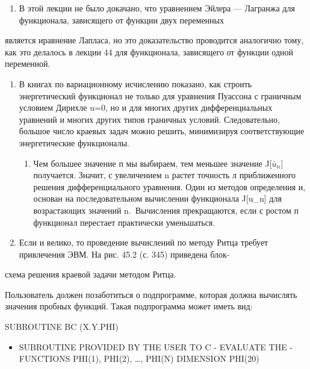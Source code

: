 \documentclass[
  ukrainian,
]{article}
\providecommand{\tightlist}{%
  \setlength{\itemsep}{0pt}\setlength{\parskip}{0pt}}
\begin{document}
\begin{enumerate}
\def\labelenumi{\arabic{enumi}.}
\setcounter{enumi}{1}
\tightlist
\item
  В этой лекции не было докачано, что уравнением Эйлера --- Лагранжа для
  функционала, зависящего от функции двух переменных
\end{enumerate}

является иравнение Лапласа, но это доказательство проводится аналогично
тому, как это делалось в лекции 44 для функционала, зависящего от
функции одной переменной.

\begin{enumerate}
\def\labelenumi{\arabic{enumi}.}
\setcounter{enumi}{2}
\item
  В книгах по вариационному исчислению показано, как строить
  энергетический функционал не только для уравнения Пуассона с граничным
  условием Дирихле u=0, но и для многих других дифференциальных
  уравнений и многих других типов граничных условий. Следовательно,
  большое число краевых задач можно решить, минимизируя соответствующие
  энергетические функционалы.

  \begin{enumerate}
  \def\labelenumii{\arabic{enumii}.}
  \setcounter{enumii}{3}
  \tightlist
  \item
    Чем большее значение п мы выбираем, тем меньшее значение
    J{[}\(\bar{u}_n]\) получается. Значит, с увеличением n растет
    точность л приближенного решения дифференциального уравнения. Один
    из методов определения и, основан на последовательном вычислении
    функционала J{[}u\_n{]} для возрастающих значений n.~Вычисления
    прекращаются, если с ростом п функционал перестает практически
    уменьшаться.
  \end{enumerate}
\item
  Если и велико, то проведение вычислений по методу Ритца требует
  привлечения ЭВМ. На рис. 45.2 (с. 345) приведена блок-
\end{enumerate}

схема решения краевой задачи методом Ритца.

Пользователь должен позаботиться о подпрограмме, которая должна
вычислять значения пробных функций. Такая подпрограмма может иметь вид:

SUBROUTINE BC (X.Y.PHI)

\begin{itemize}
\tightlist
\item
  SUBROUTINE PROVIDED BY THE USER TO C - EVALUATE THE - FUNCTIONS
  PHI(1), PHI(2), \ldots, PHI(N) DIMENSION PHI(20)
\end{itemize}
\end{document}
